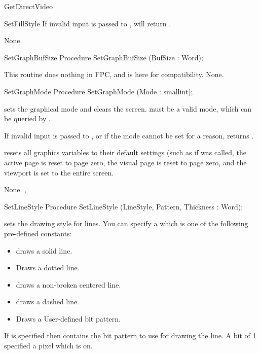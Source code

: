 \begin{function}{GetDirectVideo}
\begin{procedure}{SetFillStyle}
If invalid input is passed to ,
 will return .

\Errors
None.
\SeeAlso
{}
\end{procedure}
\begin{procedure}{SetGraphBufSize}
\Declaration
Procedure SetGraphBufSize (BufSize : Word);

\Description
This routine does nothing in FPC, and is here for compatibility.
\Errors
None.
\SeeAlso

\end{procedure}
\begin{procedure}{SetGraphMode}
\Declaration
Procedure SetGraphMode (Mode : smallint);

\Description
{} sets the
graphical mode and clears the screen.  must be a valid mode,
which can be queried by .

If invalid input is passed to , or if the mode cannot
be set for a reason,  returns .

 resets all graphics variables to their default
settings (such as if  was called, the active page
is reset to page zero, the visual page is reset to page zero, and the viewport
is set to the entire screen.

\Errors
None.
\SeeAlso
{}, 
\end{procedure}
\begin{procedure}{SetLineStyle}
\Declaration
Procedure SetLineStyle (LineStyle, Pattern, Thickness : Word);

\Description
{}
sets the drawing style for lines. You can specify a  which is
one of the following pre-defined constants:
\begin{itemize}
\item {} draws a solid line.
\item {} Draws a dotted line.
\item {} draws a non-broken centered line.
\item {} draws a dashed line.
\item {} Draws a User-defined bit pattern.
\end{itemize}
If  is specified then  contains the bit pattern to
use for drawing the line. A bit of 1 specified a pixel which is on.


\end{procedure}
\end{function}
